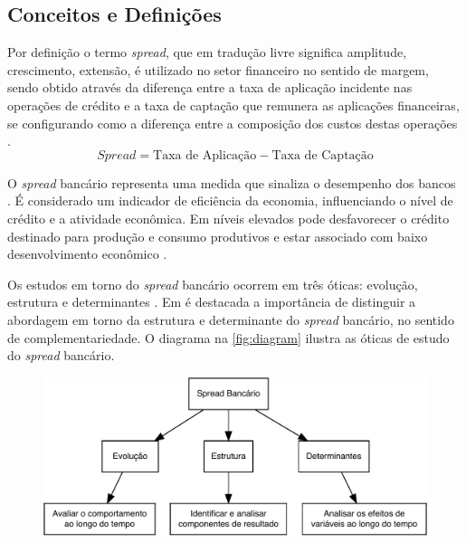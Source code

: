 \documentclass[12pt,12pt,openright,oneside,a4paper,chapter=TITLE,section=TITLE,subsection=TITLE,subsubsection=TITLE,english,french,spanish,portugues,sumario=tradicional]{abntex2}
\begin{document}
\subsection{Conceitos e Definições}

Por definição o termo \emph{spread}, que em tradução livre significa amplitude, crescimento, extensão, é utilizado no setor financeiro no sentido de margem, sendo obtido através da diferença entre a taxa de aplicação incidente nas operações de crédito e a taxa de captação que remunera as aplicações financeiras, se configurando como a diferença entre a composição dos custos destas operações \cite{BCB:2000}.
\[
Spread = \text{Taxa de Aplicação} - \text{Taxa de Captação}
\]

O \emph{spread} bancário representa uma medida que sinaliza o desempenho dos bancos \cite{levine:1997}. É considerado um indicador de eficiência da economia, influenciando o nível de crédito e a atividade econômica. Em níveis elevados pode desfavorecer o crédito destinado para produção e consumo produtivos e estar associado com baixo desenvolvimento econômico \cite{WB:2005}.

Os estudos em torno do \emph{spread} bancário ocorrem em três óticas: evolução,
estrutura e determinantes \cite{dick:1999}. Em \textcite{dick:1999} é
destacada a importância de distinguir a abordagem em torno da estrutura e
determinante do \emph{spread} bancário, no sentido de complementariedade. O diagrama
na \autoref{fig:diagram} ilustra as óticas de estudo do \emph{spread} bancário.

\begin{figure}

\begin{center}\includegraphics{12-exportedfigures/diagram.spread.otic-1} \end{center}
\label{fig:diagrama}
\end{figure}
\end{document}
